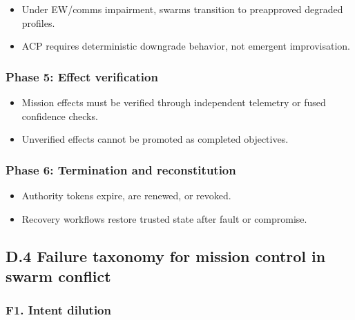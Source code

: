 \documentclass[
]{article}
\providecommand{\tightlist}{%
  \setlength{\itemsep}{0pt}\setlength{\parskip}{0pt}}
\begin{document}
\begin{itemize}
\tightlist
\item
  Under EW/comms impairment, swarms transition to preapproved degraded
  profiles.
\item
  ACP requires deterministic downgrade behavior, not emergent
  improvisation.
\end{itemize}

\hypertarget{phase-5-effect-verification}{%
\subsubsection{Phase 5: Effect
verification}\label{phase-5-effect-verification}}

\begin{itemize}
\tightlist
\item
  Mission effects must be verified through independent telemetry or
  fused confidence checks.
\item
  Unverified effects cannot be promoted as completed objectives.
\end{itemize}

\hypertarget{phase-6-termination-and-reconstitution}{%
\subsubsection{Phase 6: Termination and
reconstitution}\label{phase-6-termination-and-reconstitution}}

\begin{itemize}
\tightlist
\item
  Authority tokens expire, are renewed, or revoked.
\item
  Recovery workflows restore trusted state after fault or compromise.
\end{itemize}

\hypertarget{d.4-failure-taxonomy-for-mission-control-in-swarm-conflict}{%
\subsection{D.4 Failure taxonomy for mission control in swarm
conflict}\label{d.4-failure-taxonomy-for-mission-control-in-swarm-conflict}}

\hypertarget{f1.-intent-dilution}{%
\subsubsection{F1. Intent dilution}\label{f1.-intent-dilution}}
\end{document}
